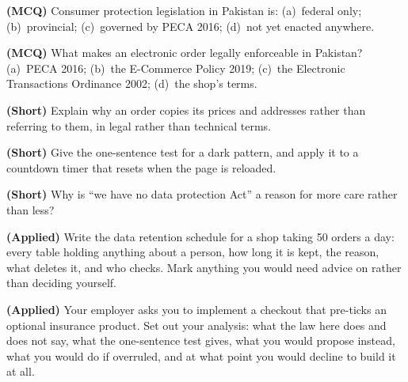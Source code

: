 \begin{reviewq}
  \item \textbf{(MCQ)} Consumer protection legislation in Pakistan is:
        (a)~federal only; (b)~provincial; (c)~governed by PECA 2016;
        (d)~not yet enacted anywhere.
  \item \textbf{(MCQ)} What makes an electronic order legally enforceable in
        Pakistan? (a)~PECA 2016; (b)~the E-Commerce Policy 2019; (c)~the
        Electronic Transactions Ordinance 2002; (d)~the shop's terms.
  \item \textbf{(Short)} Explain why an order copies its prices and addresses
        rather than referring to them, in legal rather than technical terms.
  \item \textbf{(Short)} Give the one-sentence test for a dark pattern, and
        apply it to a countdown timer that resets when the page is reloaded.
  \item \textbf{(Short)} Why is ``we have no data protection Act'' a reason for
        more care rather than less?
  \item \textbf{(Applied)} Write the data retention schedule for a shop taking
        50 orders a day: every table holding anything about a person, how long
        it is kept, the reason, what deletes it, and who checks. Mark anything
        you would need advice on rather than deciding yourself.
  \item \textbf{(Applied)} Your employer asks you to implement a checkout that
        pre-ticks an optional insurance product. Set out your analysis: what
        the law here does and does not say, what the one-sentence test gives,
        what you would propose instead, what you would do if overruled, and at
        what point you would decline to build it at all.
\end{reviewq}
